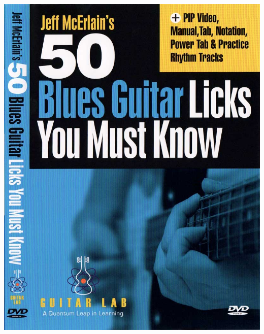 \documentclass[a4paper]{book}
\begin{document}
\begin{center}
\includegraphics[width=17cm,height=21.652cm]{lebluessupportsmethodes-img74.jpg}
\end{center}



\clearpage
\end{document}
